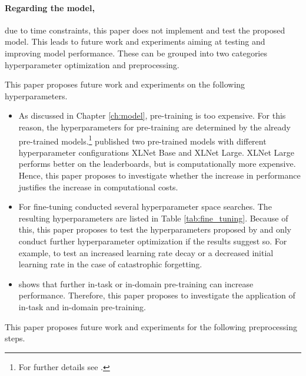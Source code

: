 \paragraph{Regarding the model,} due to time constraints, this paper does not implement and test the proposed model. This leads to future work and experiments aiming at testing and improving model performance. These can be grouped into two categories hyperparameter optimization and preprocessing.
\par
This paper proposes future work and experiments on the following hyperparameters.
\begin{itemize}
	\item As discussed in Chapter \ref{ch:model}, pre-training is too expensive. For this reason, the hyperparameters for pre-training are determined by the already pre-trained models.\footnote{For further details see \cite{Yang.2019}.} \cite{Yang.2019} published two pre-trained models with different hyperparameter configurations XLNet Base and XLNet Large. XLNet Large performs better on the leaderboards, but is computationally more expensive. Hence, this paper proposes to investigate whether the increase in performance justifies the increase in computational costs.
	\item For fine-tuning \cite{Yang.2019} conducted several hyperparameter space searches. The resulting hyperparameters are listed in Table \ref{tab:fine_tuning}. Because of this, this paper proposes to test the hyperparameters proposed by \cite{Yang.2019} and only conduct further hyperparameter optimization if the results suggest so. For example, to test an increased learning rate decay or a decreased initial learning rate in the case of catastrophic forgetting.\autocite{Sun.2019}
	\item \cite{Sun.2019} shows that further in-task or in-domain pre-training can increase performance. Therefore, this paper proposes to investigate the application of in-task and in-domain pre-training.
\end{itemize}
\par
This paper proposes future work and experiments for the following preprocessing steps.
